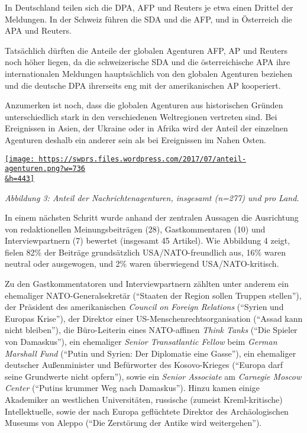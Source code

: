 In Deutschland teilen sich die DPA, AFP und Reuters je etwa einen
Drittel der Meldungen. In der Schweiz führen die SDA und die AFP, und in
Österreich die APA und Reuters.

Tatsächlich dürften die Anteile der globalen Agenturen AFP, AP und
Reuters noch höher liegen, da die schweizerische SDA und die
österreichische APA ihre internationalen Meldungen hauptsächlich von den
globalen Agenturen beziehen und die deutsche DPA ihrerseits eng mit der
amerikanischen AP kooperiert.

Anzumerken ist noch, dass die globalen Agenturen aus historischen
Gründen unterschiedlich stark in den verschiedenen Weltregionen
vertreten sind. Bei Ereignissen in Asien, der Ukraine oder in Afrika
wird der Anteil der einzelnen Agenturen deshalb ein anderer sein als bei
Ereignissen im Nahen Osten.

\href{https://swprs.files.wordpress.com/2017/07/anteil-agenturen.png}{\texttt{[image: https://swprs.files.wordpress.com/2017/07/anteil-agenturen.png?w=736\\\&h=443]}}

\emph{Abbildung 3: Anteil der Nachrichtenagenturen, insgesamt (n=277)
und pro Land.}

In einem nächsten Schritt wurde anhand der zentralen Aussagen die
Ausrichtung von redaktionellen Meinungsbeiträgen (28), Gastkommentaren
(10) und Interviewpartnern (7) bewertet (insgesamt 45 Artikel). Wie
Abbildung 4 zeigt, fielen 82\% der Beiträge grundsätzlich
USA/NATO-freundlich aus, 16\% waren neutral oder ausgewogen, und 2\%
waren überwiegend USA/NATO-kritisch.

Zu den Gastkommentatoren und Interviewpartnern zählten unter anderem ein
ehemaliger NATO-Generalsekretär (``Staaten der Region sollen Truppen
stellen''), der Präsident des amerikanischen \emph{Council on Foreign
Relations} (``Syrien und Europas Krise''), der Direktor einer
US-Menschenrechtsorganisation (``Assad kann nicht bleiben''), die
Büro-Leiterin eines NATO-affinen \emph{Think Tanks} (``Die Spieler von
Damaskus''), ein ehemaliger \emph{Senior Transatlantic Fellow} beim
\emph{German Marshall Fund} (``Putin und Syrien: Der Diplomatie eine
Gasse''), ein ehemaliger deutscher Außenminister und Befürworter des
Kosovo-Krieges (``Europa darf seine Grundwerte nicht opfern''), sowie
ein \emph{Senior Associate} am \emph{Carnegie Moscow Center} (``Putins
krummer Weg nach Damaskus''). Hinzu kamen einige Akademiker an
westlichen Universitäten, russische (zumeist Kreml-kritische)
Intellektuelle, sowie der nach Europa geflüchtete Direktor des
Archäologischen Museums von Aleppo (``Die Zerstörung der Antike wird
weitergehen'').

